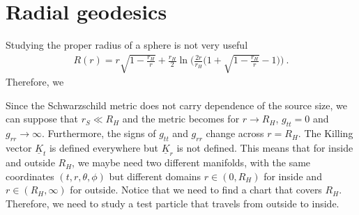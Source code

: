 \section{Radial geodesics}

    Studying the proper radius of a sphere is not very useful 
    \begin{equation*}
    \begin{aligned}
        R(r) = r \sqrt{1 - \frac{r_H}{r}} + \frac{r_H}{2} \ln \Big (\frac{2r}{r_H} \Big( 1 + \sqrt{1 - \frac{r_H}{r}} - 1 \Big)) ~.
    \end{aligned}
    \end{equation*}
    Therefore, we

    Since the Schwarzschild metric does not carry dependence of the source size, we can suppose that $r_S \ll R_H$ and the metric becomes for $r \rightarrow R_H$, $g_{tt} = 0$ and $g_{rr} \rightarrow \infty$. Furthermore, the signs of $g_{tt}$ and $g_{rr}$ change across $r = R_H$. The Killing vector $\underline K_t$ is defined everywhere but $\underline K_r$ is not defined. This means that for inside and outside $R_H$, we maybe need two different manifolds, with the same coordinates $(t, r, \theta, \phi)$ but different domains $r \in (0, R_H)$ for inside and $r \in (R_H, \infty)$ for outside. Notice that we need to find a chart that covers $R_H$. Therefore, we need to study a test particle that travels from outside to inside. 

